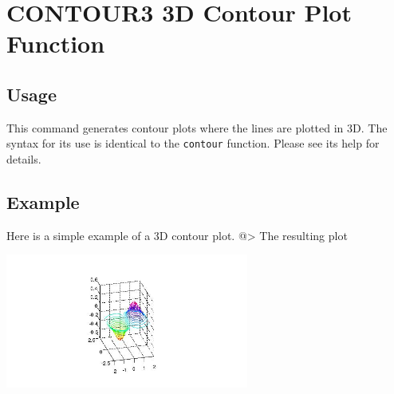 \section{CONTOUR3 3D Contour Plot Function}

\subsection{Usage}

This command generates contour plots where the lines are plotted in 3D.
The syntax for its use is identical to the \verb|contour| function.  Please
see its help for details.
\subsection{Example}

Here is a simple example of a 3D contour plot.
@>
The resulting plot


\centerline{\includegraphics[width=8cm]{contour3_1}}

